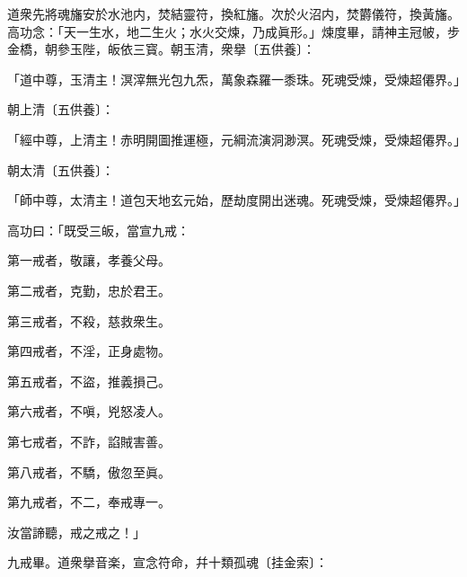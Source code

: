 道衆先將魂旛安於水池内，焚結靈符，換紅旛。次於火沼内，焚欝儀符，換黃旛。高功念：「天一生水，地二生火；水火交煉，乃成眞形。」煉度畢，請神主冠帔，步金橋，朝參玉陛，皈依三寳。朝玉清，衆擧〔五供養〕：

\begin{myquote}
「道中尊，玉清主！溟滓無光包九炁，萬象森羅一黍珠。死魂受煉，受煉超僊界。」
\end{myquote}

朝上清〔五供養〕：

\begin{myquote}
「經中尊，上清主！赤明開圖推運極，元綱流演洞渺溟。死魂受煉，受煉超僊界。」
\end{myquote}

朝太清〔五供養〕：

\begin{myquote}
「師中尊，太清主！道包天地玄元始，歷劫度開出迷魂。死魂受煉，受煉超僊界。」
\end{myquote}

高功曰：「既受三皈，當宣九戒：

\begin{myquote}
第一戒者，敬讓，孝養父母。

第二戒者，克勤，忠於君王。

第三戒者，不殺，慈救衆生。

第四戒者，不淫，正身處物。

第五戒者，不盜，推義損己。

第六戒者，不嗔，兇怒凌人。

第七戒者，不詐，諂賊害善。

第八戒者，不驕，傲忽至眞。

第九戒者，不二，奉戒專一。

汝當諦聽，戒之戒之！」
\end{myquote}

九戒畢。道衆擧音楽，宣念符命，幷十類孤魂〔挂金索〕：

